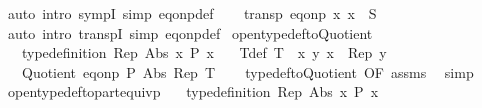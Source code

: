 \begin{isabellebody}
\ {\isacharparenleft}{\kern0pt}auto\ intro{\isacharcolon}{\kern0pt}\ sympI\ simp{\isacharcolon}{\kern0pt}\ eq{\isacharunderscore}{\kern0pt}onp{\isacharunderscore}{\kern0pt}def{\isacharparenright}{\kern0pt}\isanewline
{}\isamarkupfalse%
\isanewline
\ \ \isamarkupfalse%
\ {\isachardoublequoteopen}transp\ {\isacharparenleft}{\kern0pt}eq{\isacharunderscore}{\kern0pt}onp\ {\isacharparenleft}{\kern0pt}{\isasymlambda}x{\isachardot}{\kern0pt}\ x\ {\isasymin}\ S{\isacharparenright}{\kern0pt}{\isacharparenright}{\kern0pt}{\isachardoublequoteclose}\ \isamarkupfalse%
\ {\isacharparenleft}{\kern0pt}auto\ intro{\isacharcolon}{\kern0pt}\ transpI\ simp{\isacharcolon}{\kern0pt}\ eq{\isacharunderscore}{\kern0pt}onp{\isacharunderscore}{\kern0pt}def{\isacharparenright}{\kern0pt}\isanewline
{}\isamarkupfalse%
%
\endisatagproof
{\isafoldproof}%
%
\isadelimproof
\isanewline
%
\endisadelimproof
\isanewline
{}\isamarkupfalse%
\ open{\isacharunderscore}{\kern0pt}typedef{\isacharunderscore}{\kern0pt}to{\isacharunderscore}{\kern0pt}Quotient{\isacharcolon}{\kern0pt}\isanewline
\ \ \ {\isachardoublequoteopen}type{\isacharunderscore}{\kern0pt}definition\ Rep\ Abs\ {\isacharbraceleft}{\kern0pt}x{\isachardot}{\kern0pt}\ P\ x{\isacharbraceright}{\kern0pt}{\isachardoublequoteclose}\isanewline
\ \ \ T{\isacharunderscore}{\kern0pt}def{\isacharcolon}{\kern0pt}\ {\isachardoublequoteopen}T\ {\isasymequiv}\ {\isacharparenleft}{\kern0pt}{\isasymlambda}x\ y{\isachardot}{\kern0pt}\ x\ {\isacharequal}{\kern0pt}\ Rep\ y{\isacharparenright}{\kern0pt}{\isachardoublequoteclose}\isanewline
\ \ \ {\isachardoublequoteopen}Quotient\ {\isacharparenleft}{\kern0pt}eq{\isacharunderscore}{\kern0pt}onp\ P{\isacharparenright}{\kern0pt}\ Abs\ Rep\ T{\isachardoublequoteclose}\isanewline
%
\isadelimproof
\ \ %
\endisadelimproof
%
\isatagproof
{}\isamarkupfalse%
\ typedef{\isacharunderscore}{\kern0pt}to{\isacharunderscore}{\kern0pt}Quotient\ {\isacharbrackleft}{\kern0pt}OF\ assms{\isacharbrackright}{\kern0pt}\ \isamarkupfalse%
\ simp%
\endisatagproof
{\isafoldproof}%
%
\isadelimproof
\isanewline
%
\endisadelimproof
\isanewline
{}\isamarkupfalse%
\ open{\isacharunderscore}{\kern0pt}typedef{\isacharunderscore}{\kern0pt}to{\isacharunderscore}{\kern0pt}part{\isacharunderscore}{\kern0pt}equivp{\isacharcolon}{\kern0pt}\isanewline
\ \ \ {\isachardoublequoteopen}type{\isacharunderscore}{\kern0pt}definition\ Rep\ Abs\ {\isacharbraceleft}{\kern0pt}x{\isachardot}{\kern0pt}\ P\ x{\isacharbraceright}{\kern0pt}{\isachardoublequoteclose}\isanewline

\end{isabellebody}
